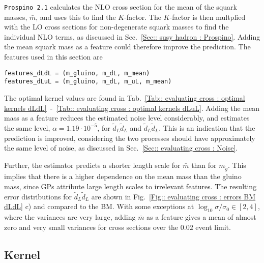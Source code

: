 \documentclass[twoside,english]{uiofysmaster}
\begin{document}
\verb|Prospino 2.1| calculates the NLO cross section for the mean of the squark masses, $\bar{m}$, and uses this to find the $K$-factor. The $K$-factor is then multplied with the LO cross sections for non-degenerate squark masses to find the individual NLO terms, as discussed in Sec.~\ref{Sec:: susy hadron : Prospino}. Adding the mean squark mass as a feature could therefore improve the prediction. The features used in this section are
\begin{lstlisting}
features_dLdL = (m_gluino, m_dL, m_mean)
features_dLuL = (m_gluino, m_dL, m_uL, m_mean)
\end{lstlisting}
The optimal kernel values are found in Tab.~\ref{Tab:: evaluating cross : optimal kernels dLdL}~-~\ref{Tab:: evaluating cross : optimal kernels dLuL}. Adding the mean mass as a feature reduces the estimated noise level considerably, and estimates the same level, $\alpha = 1.19 \cdot 10^{-5}$, for $\tilde{d}_L \tilde{d}_L$ and $\tilde{d}_L \tilde{d}_L$. This is an indication that the prediction is improved, considering the two processes should have approximately the same level of noise, as discussed in Sec.~\ref{Sec:: evaluating cross : Noise}. 

Further, the estimator predicts a shorter length scale for $\bar{m}$ than for $m_{\tilde{g}}$. This implies that there is a higher dependence on the mean mass than the gluino mass, since GPs attribute large length scales to irrelevant features. The resulting error distributions for $\tilde{d}_L \tilde{d}_L$ are shown in Fig.~\ref{Fig:: evaluating cross : errors BM dLdL} c) and compared to the BM. With some exceptions at $\log_{10} \sigma/\sigma_0 \in [2,4]$, where the variances are very large, adding $\bar{m}$ as a feature gives a mean of almost zero and very small variances for cross sections over the $0.02$ event limit. 




\subsection{Kernel}
\end{document}
